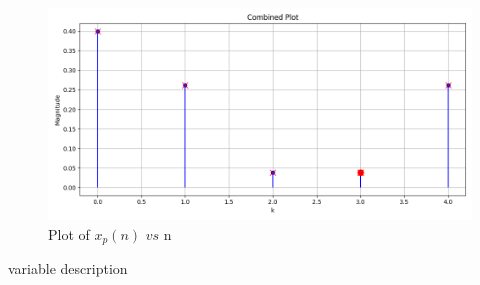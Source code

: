 \documentclass[journal,12pt,twocolumn]{IEEEtran}
\theoremstyle{remark}
\begin{document}
\begin{figure}[ht]
    \centering
    \includegraphics[width=\columnwidth]{2023/EE/50/figs/Figure_3.png}
    \caption{Plot of $x_p(n)$ $vs$ n}
    \label{fig:GATE.2023.EE.50.3}
\end{figure}
\begin{table}[h!]
    \centering
    
    \caption{variable description}
    \label{tab:GATE.2023.EE.50.4}
\end{table}\\
\end{document}
